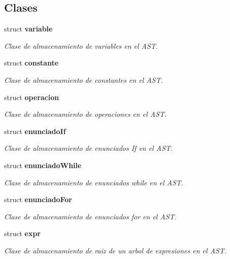 \subsection*{Clases}
\begin{CompactItemize}
\item 
struct {\bf variable}
\begin{CompactList}\small\item\em Clase de almacenamiento de variables en el AST. \item\end{CompactList}\item 
struct {\bf constante}
\begin{CompactList}\small\item\em Clase de almacenamiento de constantes en el AST. \item\end{CompactList}\item 
struct {\bf operacion}
\begin{CompactList}\small\item\em Clase de almacenamiento de operaciones en el AST. \item\end{CompactList}\item 
struct {\bf enunciado\-If}
\begin{CompactList}\small\item\em Clase de almacenamiento de enunciados If en el AST. \item\end{CompactList}\item 
struct {\bf enunciado\-While}
\begin{CompactList}\small\item\em Clase de almacenamiento de enunciados while en el AST. \item\end{CompactList}\item 
struct {\bf enunciado\-For}
\begin{CompactList}\small\item\em Clase de almacenamiento de enunciados for en el AST. \item\end{CompactList}\item 
struct {\bf expr}
\begin{CompactList}\small\item\em Clase de almacenamiento de raiz de un arbol de expresiones en el AST. \item\end{CompactList}\item 

\end{CompactItemize}
